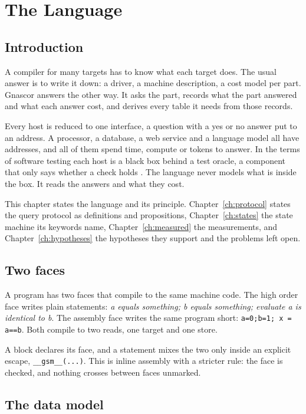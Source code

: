 \chapter{The Language}
\label{ch:language}

\section{Introduction}

A compiler for many targets has to know what each target does. The usual answer is to write it
down: a driver, a machine description, a cost model per part. Gnascor answers the other way. It
asks the part, records what the part answered and what each answer cost, and derives every table
it needs from those records.

Every host is reduced to one interface, a question with a yes or no answer put to an address. A
processor, a database, a web service and a language model all have addresses, and all of them
spend time, compute or tokens to answer. In the terms of software testing each host is a black
box behind a test oracle, a component that only says whether a check holds \cite{src:Howden-1978}.
The language never models what is inside the box. It reads the answers and what they cost.

This chapter states the language and its principle. Chapter~\ref{ch:protocol} states the query
protocol as definitions and propositions, Chapter~\ref{ch:states} the state machine its keywords
name, Chapter~\ref{ch:measured} the measurements, and Chapter~\ref{ch:hypotheses} the hypotheses
they support and the problems left open.

\section{Two faces}

A program has two faces that compile to the same machine code. The high order face writes plain
statements: \emph{a equals something; b equals something; evaluate a is identical to b}. The
assembly face writes the same program short: \texttt{a=0;b=1; x = a==b}. Both compile to two
reads, one target and one store.

A block declares its face, and a statement mixes the two only inside an explicit escape,
\texttt{\_\_gsm\_\_(...)}. This is inline assembly with a stricter rule: the face is checked, and
nothing crosses between faces unmarked.

\section{The data model}

